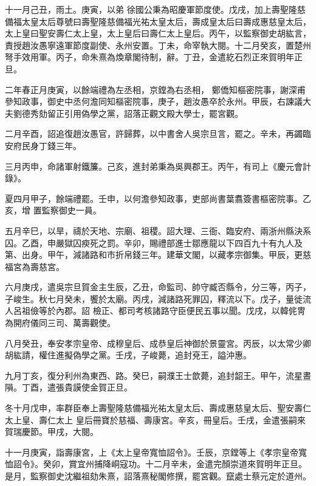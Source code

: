 \begin{pinyinscope}
 十一月己丑，雨土。庚寅，以弟
 徐國公秉為昭慶軍節度使。戊戌，加上壽聖隆慈備福太皇太后尊號曰壽聖隆慈備福光祐太皇太后，壽成皇太后曰壽成惠慈皇太后，太上皇曰聖安壽仁太上皇，太上皇后曰壽仁太上皇后。丙午，以監察御史胡紘言，責授趙汝愚寧遠軍節度副使、永州安置。丁未，命宰執大閱。十二月癸亥，置楚州弩手效用軍。丙子，命朱熹為煥章閣待制，辭。丁丑，金遣紇石烈正來賀明年正旦。



 二年春正月庚寅，以餘端禮為左丞相，京鏜為右丞相，
 鄭僑知樞密院事，謝深甫參知政事，御史中丞何澹同知樞密院事，庚子，趙汝愚卒於永州。甲辰，右諫議大夫劉德秀劾留正引用偽學之黨，詔落正觀文殿大學士，罷宮觀。



 二月辛酉，詔追復趙汝愚官，許歸葬，以中書舍人吳宗旦言，罷之。辛未，再蠲臨安府民身丁錢三年。



 三月丙申，命諸軍射鐵簾。己亥，進封弟秉為吳興郡王。丙午，有司上《慶元會計錄》。



 夏四月甲子，餘端禮罷。壬申，以何澹參知政事，吏部尚書葉翥簽書樞密院事。乙亥，增
 置監察御史一員。



 五月辛巳，以旱，禱於天地、宗廟、祖稷。詔大理、三衙、臨安府、兩浙州縣決系囚。乙酉，申嚴獄囚瘐死之罰。辛卯，賜禮部進士鄒應龍以下四百九十有九人及第、出身。甲午，減諸路和市折帛錢三年。建華文閣，以藏孝宗御集。甲辰，更慈福宮為壽慈宮。



 六月庚戌，遣吳宗旦賀金主生辰，乙丑，命監司、帥守臧否縣令，分三等，丙子，子峻生。秋七月癸未，饗於太廟。丙戌，減諸路死罪囚，釋流以下。戊子，量徙流人呂祖儉等於內郡。詔
 檢正、都司考核諸路守臣便民五事以聞。戊戌，以韓侂冑為開府儀同三司、萬壽觀使。



 八月癸丑，奉安孝宗皇帝、成穆皇后、成恭皇后神御於景靈宮。丙辰，以太常少卿胡紘請，權住進擬偽學之黨。壬戌，子峻薨，追封兗王，謚沖惠。



 九月丁亥，復分利州為東西、路。癸巳，嗣濮王士歆薨，追封韶王。甲午，流星晝隕。丁酉，遣張貴謨使金賀正旦。



 冬十月戊申，率群臣奉上壽聖隆慈備福光祐太皇太后、壽成惠慈皇太后、聖安壽仁太上皇、壽仁太上
 皇后冊寶於慈福、壽康宮。辛亥，冊皇后。壬戌，金遣張嗣來賀瑞慶節。甲戌，大閱。



 十一月庚寅，詣壽康宮，上《太上皇帝寬恤詔令》。壬辰，京鏜等上《孝宗皇帝寬恤詔令》。癸卯，賞宜州捕降峒寇功。十二月辛未，金遣完顏崇道來賀明年正旦。是月，監察御史沈繼祖劾朱熹，詔落熹秘閣修撰，罷宮觀。竄處士蔡元定於道州。




\end{pinyinscope}

